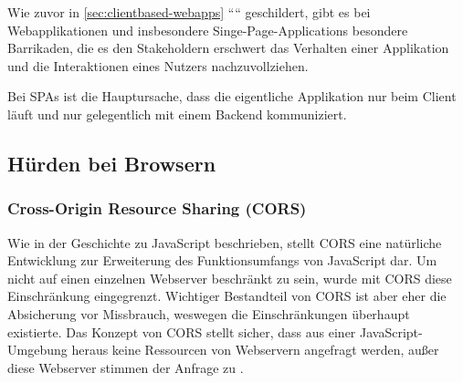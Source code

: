 Wie zuvor in \autoref{sec:clientbased-webapps} ```` geschildert, gibt es bei Webapplikationen und insbesondere Singe-Page-Applications besondere Barrikaden, die es den Stakeholdern erschwert das Verhalten einer Applikation und die Interaktionen eines Nutzers nachzuvollziehen.
	
Bei SPAs ist die Hauptursache, dass die eigentliche Applikation nur beim Client läuft und nur gelegentlich mit einem Backend kommuniziert.
	


\subsection{Hürden bei Browsern}


\subsubsection{Cross-Origin Resource Sharing (CORS)}

Wie in der Geschichte zu JavaScript beschrieben, stellt CORS eine natürliche Entwicklung zur Erweiterung des Funktionsumfangs von JavaScript dar. Um nicht auf einen einzelnen Webserver beschränkt zu sein, wurde mit CORS diese Einschränkung eingegrenzt. Wichtiger Bestandteil von CORS ist aber eher die Absicherung vor Missbrauch, weswegen die Einschränkungen überhaupt existierte. Das Konzept von CORS stellt sicher, dass aus einer JavaScript-Umgebung heraus keine Ressourcen von Webservern angefragt werden, außer diese Webserver stimmen der Anfrage zu \cite{MDNCORS}.

